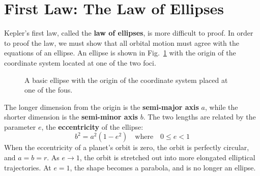 \documentclass{../../oss-handout}
\begin{document}
\section{First Law: The Law of Ellipses}
Kepler's first law, called the \textbf{law of ellipses}, is more difficult to
proof. In order to proof the
law, we must show that all orbital motion must agree with the equations of an
ellipse. An ellipse is shown in Fig.~\ref{ellipse1} with the origin of the
coordinate system located at one of the two foci.
\begin{figure}[!ht]
  \centering
  \caption{A basic ellipse with the origin of the coordinate system placed at
    one of the fous.}
  \label{ellipse1}
\end{figure}

The longer dimension from the origin is the \textbf{semi-major axis} $a$, while
the shorter dimension is the \textbf{semi-minor axis} $b$. The two lengths are
related by the parameter $e$, the \textbf{eccentricity} of the ellipse:
\begin{equation}
  b^2=a^2(1-e^2)\quad\text{where}\quad 0\leq e < 1
\end{equation}
When the eccentricity of a planet's orbit is zero, the orbit is perfectly
circular, and $a=b=r$. As $e\rightarrow 1$, the orbit is stretched out into
more elongated elliptical trajectories. At $e=1$, the shape becomes a parabola,
and is no longer an ellipse.
\end{document}
